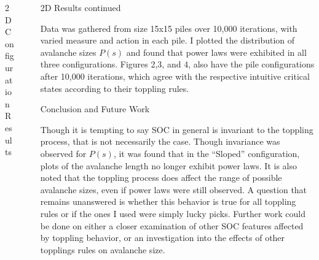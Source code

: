 \documentclass[final]{beamer}
\newlength{\sepwid}
\newlength{\onecolwid}
\begin{document}
\begin{frame}[t]
\begin{columns}[t]
\begin{column}{\onecolwid}
\begin{block}{2D Configuration Results}
\end{block}


\end{column} %

\begin{column}{\sepwid}\end{column} %

\begin{column}{\onecolwid} %


\begin{block}{2D Results continued}

Data was gathered from size 15x15 piles over 10,000 iterations, with varied measure and action in each pile. I plotted the distribution of avalanche sizes $P(s)$ and found that power laws were exhibited in all three configurations. Figures 2,3, and 4, also have the pile configurations after 10,000 iterations, which agree with the respective intuitive critical states according to their toppling rules.

\end{block}


\begin{block}{Conclusion and Future Work}

Though it is tempting to say SOC in general is invariant to the toppling process, that is not necessarily the case. Though invariance was observed for $P(s)$, it was found that in the ``Sloped'' configuration, plots of the avalanche length no longer exhibit power laws.
It is also noted that the toppling process does affect the range of possible avalanche sizes, even if power laws were still observed. A question that remains unanswered is whether this behavior is true for all toppling rules or if the ones I used were simply lucky picks.
Further work could be done on either a closer examination of other SOC features affected by toppling behavior, or an investigation into the effects of other topplings rules on avalanche size.


\end{block}
\end{column}
\end{columns}
\end{frame}
\end{document}
